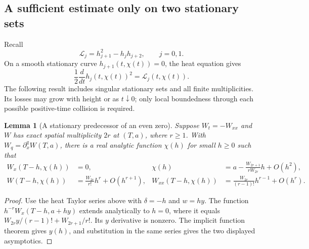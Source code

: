 \documentclass[11pt]{article}
\numberwithin{equation}{section}
\newtheorem{lemma}[theorem]{Lemma}
\theoremstyle{definition}
\theoremstyle{remark}
\begin{document}
\subsection{A sufficient estimate only on two stationary sets}

Recall
\[
 \mathcal L_j=h_{j+1}^2-h_jh_{j+2},\qquad j=0,1.
\]
On a smooth stationary curve $h_{j+1}(t,\chi(t))=0$, the heat equation
gives
\[
 \frac12\frac{d}{dt}h_j(t,\chi(t))^2=\mathcal L_j(t,\chi(t)).
\]
The following result includes singular stationary sets and all finite
multiplicities.  Its losses may grow with height or as $t\downarrow0$;
only local boundedness through each possible positive-time collision
is required.

\begin{lemma}[A stationary predecessor of an even zero]
\label{fc:predecessor}
Suppose $W_t=-W_{xx}$ and $W$ has exact spatial multiplicity $2r$ at
$(T,a)$, where $r\ge1$.  With $W_q=\partial_x^qW(T,a)$, there is a
real analytic function $\chi(h)$ for small $h\ge0$ such that
\begin{align*}
 W_x(T-h,\chi(h))&=0,&
 \chi(h)&=a-\frac{W_{2r+1}}{rW_{2r}}h+O(h^2),\\
 W(T-h,\chi(h))&=\frac{W_{2r}}{r!}h^r+O(h^{r+1}),&
 W_{xx}(T-h,\chi(h))&=\frac{W_{2r}}{(r-1)!}h^{r-1}+O(h^r).
\end{align*}
\end{lemma}
\begin{proof}
Use the heat Taylor series above with $\delta=-h$ and $w=hy$.
The function $h^{-r}W_x(T-h,a+hy)$ extends analytically to $h=0$,
where it equals
$W_{2r}y/(r-1)!+W_{2r+1}/r!$.
Its $y$ derivative is nonzero.  The implicit function theorem gives
$y(h)$, and substitution in the same series gives the two displayed
asymptotics.
\end{proof}
\end{document}
